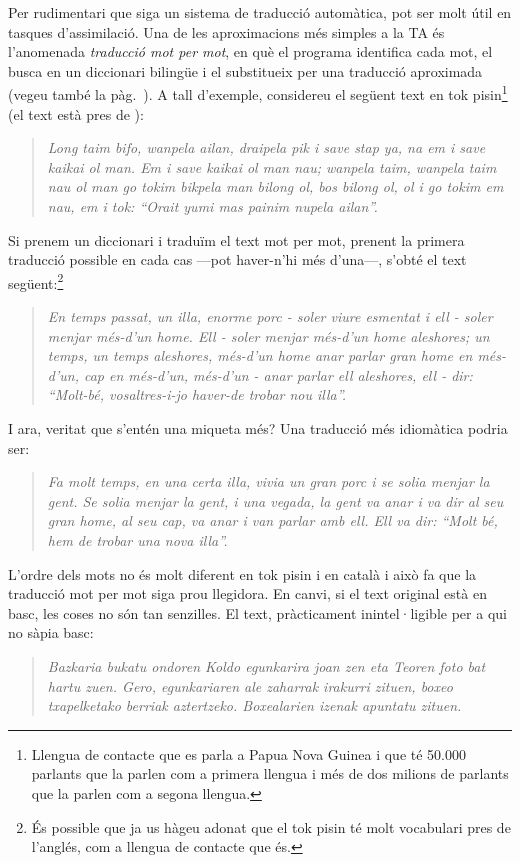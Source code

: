 Per rudimentari que siga un sistema de traducció automàtica, pot ser
molt útil en tasques d'assimilació. Una de les aproximacions més
simples a la TA és l'anomenada \emph{traducció mot per mot}, en què el
programa identifica cada mot, el busca en un diccionari bilingüe i el
substitueix per una traducció aproximada (vegeu també la
pàg.~\pageref{pg:mpm}). A tall d'exemple, considereu el següent text en
tok pisin\footnote{Llengua de contacte que es parla a Papua Nova
  Guinea i que té 50.000 parlants que la parlen com a primera llengua
  i més de dos milions de parlants que la parlen com a segona
  llengua.} (el text està pres de \citealt{lyovin97b}):
\begin{quote}{\sl Long taim bifo, wanpela ailan, draipela pik i save
    stap ya, na em i save kaikai ol man. Em i save kaikai ol man nau;
    wanpela taim, wanpela taim nau ol man go tokim bikpela man bilong
    ol, bos bilong ol, ol i go tokim em nau, em i tok: ``Orait yumi
    mas painim nupela ailan''. }
\end{quote} 
Si prenem un diccionari i traduïm el text mot per mot, prenent la
primera traducció possible en cada cas ---pot haver-n'hi més d'una---,
s'obté el text següent:\footnote{És possible que ja us hàgeu adonat
  que el tok pisin té molt vocabulari pres de l'anglés, com a llengua
  de contacte que és.}
\begin{quote}{\sl En temps passat, un illa, enorme porc - soler viure
    esmentat i ell - soler menjar més-d'un home. Ell - soler menjar
    més-d'un home aleshores; un temps, un temps aleshores, més-d'un
    home anar parlar gran home en més-d'un, cap en més-d'un, més-d'un
    - anar parlar ell aleshores, ell - dir: ``Molt-bé, vosaltres-i-jo
    haver-de trobar nou illa''.}
\end{quote}
I ara, veritat que s'entén una miqueta més? Una traducció
més idiomàtica podria ser:
\begin{quote}{\sl Fa molt temps, en una certa illa, vivia un gran porc
    i se solia menjar la gent. Se solia menjar la gent, i una vegada,
    la gent va anar i va dir al seu gran home, al seu cap, va anar i
    van parlar amb ell. Ell va dir: ``Molt bé, hem de trobar una nova
    illa''.}
\end{quote}
L'ordre dels mots no és molt diferent en tok pisin i en català i això
fa que la traducció mot per mot siga prou llegidora. En canvi, si el
text original està en basc, les coses no són tan senzilles. El text,
pràcticament inintel·ligible per a qui no sàpia basc:
\begin{quote}{\sl Bazkaria bukatu ondoren Koldo egunkarira joan zen
    eta Teoren foto bat hartu zuen. Gero, egunkariaren ale zaharrak
    irakurri zituen, boxeo txapelketako berriak
    aztertzeko. Boxealarien izenak apuntatu zituen.}
\end{quote}
